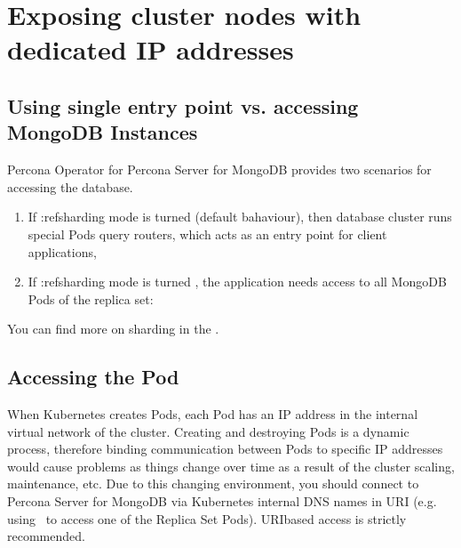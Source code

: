 \documentclass[letterpaper,10pt,english]{sphinxmanual}
\begin{document}
\begin{sphinxVerbatim}[commandchars=\\\{\}]
    
\end{sphinxVerbatim}


\chapter{Exposing cluster nodes with dedicated IP addresses}
\label{\detokenize{expose:exposing-cluster-nodes-with-dedicated-ip-addresses}}\label{\detokenize{expose::doc}}

\section{Using single entry point vs. accessing MongoDB Instances}
\label{\detokenize{expose:using-single-entry-point-vs-accessing-mongodb-instances}}
Percona Operator for Percona Server for MongoDB provides two scenarios for
accessing the database.
\begin{enumerate}
%
\item {} 
If :ref\textasciigrave{}sharding\textasciigrave{} mode is turned  (default bahaviour), then database
cluster runs special  Pods \sphinxhyphen{} query routers, which acts as an entry
point for client applications,

\noindent{}

\item {} 
If :ref\textasciigrave{}sharding\textasciigrave{} mode is turned , the application needs access to all
MongoDB Pods of the replica set:

\noindent{}

\end{enumerate}

You can find more on sharding in the .


\section{Accessing the Pod}
\label{\detokenize{expose:accessing-the-pod}}
When Kubernetes creates Pods, each Pod has an IP address in the
internal virtual network of the cluster. Creating and destroying
Pods is a dynamic process, therefore binding communication between Pods to
specific IP addresses would cause problems as things change over
time as a result of the cluster scaling, maintenance, etc. Due to
this changing environment, you should connect to Percona Server for MongoDB via Kubernetes
internal DNS names in URI
(e.g. using  to access one of the Replica Set Pods).
URI\sphinxhyphen{}based access is strictly recommended.
\end{document}
